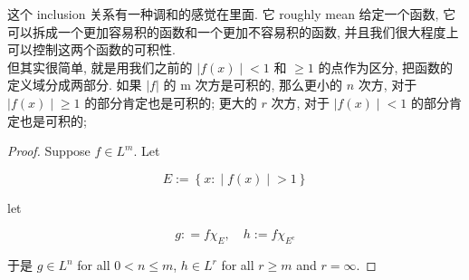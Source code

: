 \documentclass{qlnotes-export}
\begin{document}
这个 inclusion 关系有一种调和的感觉在里面. 它 roughly mean 给定一个函数, 它可以拆成一个更加容易积的函数和一个更加不容易积的函数, 并且我们很大程度上可以控制这两个函数的可积性.\\
但其实很简单, 就是用我们之前的 \(\left. |f(x) \middle| < 1 \right.\) 和 \(\geq 1\) 的点作为区分, 把函数的定义域分成两部分. 如果 \(|f|\) 的 m 次方是可积的, 那么更小的 \(n\) 次方, 对于 \(\left. |f(x) \middle| \geq 1 \right.\) 的部分肯定也是可积的; 更大的 \(r\) 次方, 对于 \(\left. |f(x) \middle| < 1 \right.\) 的部分肯定也是可积的;

\begin{proof}

Suppose \(f \in L^{m}\). Let

\[E := \left\{ x: \middle| f(x) \middle| > 1 \right\}\]

let

\[g: = f\chi_{E},\quad h := f\chi_{E^{c}}\]

于是 \(g \in L^{n}\) for all \(0 < n \leq m\), \(h \in L^{r}\) for all \(r \geq m\) and \(r = \infty\).

\end{proof}
\end{document}
